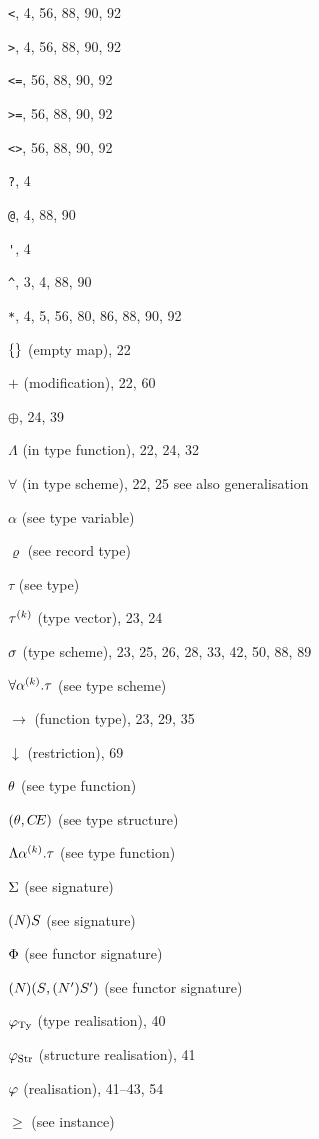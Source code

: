 \begin{theindex}
\item \verb+<+, 4, 56, 88, 90, 92
\item \verb+>+, 4, 56, 88, 90, 92
\item \verb+<=+, 56, 88, 90, 92
\item \verb+>=+, 56, 88, 90, 92
\item \verb+<>+, 56, 88, 90, 92
\item \verb+?+, 4
\item \verb+@+, 4, 88, 90
\item \verb+'+, 4
\item \verb+^+, 3, 4, 88, 90
\item \verb+*+, 4, 5, 56, 80, 86, 88, 90, 92
\item $\{\}$ (empty map), 22
\item $+$ (modification), 22, 60
\item $\oplus$, 24, 39
\item $\Lambda$ (in type function), 22, 24, 32
\item $\forall$ (in type scheme), 22, 25
\subitem see also generalisation 
\item $\alpha$ (see type variable) 
\item $\varrho$ (see record type) 
\item $\tau$ (see type) 
\item $\mbox{$\tau^{(k)}$}$ (type vector), 23, 24
\item $\sigma$ (type scheme), 23, 25, 26, 28, 33, 42, 50, 88, 89
\item $\forall\mbox{$\alpha^{(k)}$}.\tau$ (see type scheme) 
\item $\rightarrow$ (function type), 23, 29, 35
\item $\downarrow$ (restriction), 69
\item $\theta$ (see type function) 
\item $(\theta,\mbox{$C\!E$})$ (see type structure) 
\item $\Lambda\mbox{$\alpha^{(k)}$}.\tau$ (see type function) 
\item $\Sigma$ (see signature) 
\item $(N_{})S_{}$ (see signature) 
\item $\Phi$ (see functor signature) 
\item $(N_{})(S_{},(N_{}')S_{} ')$ (see functor signature) 
\item $\varphi_{\rm Ty}$ (type realisation), 40
\item $\varphi_{\rm Str}$ (structure realisation), 41
\item $\varphi$ (realisation), 41--43, 54
\item $\geq$ (see instance) 

\end{theindex}

